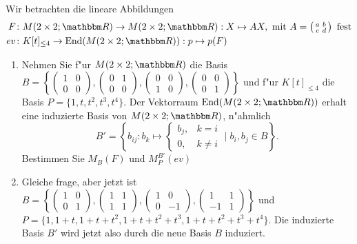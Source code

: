 \documentclass[a4,11pt]{article}
\DeclareMathOperator{\End}{End}
\begin{document}
\begin{aufgabe}
  Wir betrachten die lineare Abbildungen 
  \begin{align*}
  F &\colon M(2 \times 2; \R) \to M(2 \times 2; \R) : X \mapsto AX, \ \text{mit} \ 
  A =
  \left( \begin{smallmatrix}a&b\\c&d\end{smallmatrix}\right) \ \text{fest}\\
  ev &\colon K[t]_{\le 4} \to \End(M(2 \times 2; \R)) : p \mapsto
  p(F)
  \end{align*}
  
  \begin{enumerate}
  \item
  Nehmen Sie f"ur $M(2 \times 2; \R)$ die Basis $B =\left\{ \left( \begin{smallmatrix}1&0\\0&0\end{smallmatrix}\right),\left(  \begin{smallmatrix}0&1\\0&0\end{smallmatrix}\right),\left(  \begin{smallmatrix}0&0\\1&0\end{smallmatrix}\right),\left(\begin{smallmatrix}0&0\\0&1\end{smallmatrix} \right)\right\}$ und f"ur $K[t]_{\leq 4}$ die Basis $P = \{1, t, t^2, t^3, t^4\}$. 
  Der Vektorraum $\End(M(2 \times 2; \R))$ erhalt eine induzierte Basis von $M(2 \times 2; \R)$, n"ahmlich $$B' = \left\{ b_{ij} : b_k \mapsto \begin{cases} b_j, & k = i \\ 0, & k\neq i\end{cases}  \mid b_i, b_j \in B \right\}.$$
  Bestimmen Sie $M_B(F)$ und $M_P^{B'}(ev)$
  \item
  Gleiche frage, aber jetzt ist $B =\left\{ \left( \begin{smallmatrix}1&0\\0&1\end{smallmatrix}\right),\left(  \begin{smallmatrix}1&1\\1&1\end{smallmatrix}\right),\left(  \begin{smallmatrix}1&0\\0&-1\end{smallmatrix}\right),\left(\begin{smallmatrix}1&1\\-1&1\end{smallmatrix} \right)\right\}$ und $P = \{1,1+ t, 1+t+t^2, 1+t+t^2+t^3, 1+t+t^2+t^3+t^4\}$. Die induzierte Basis $B'$ wird jetzt also durch die neue Basis $B$ induziert.
  \end{enumerate}
\end{aufgabe}
\end{document}
